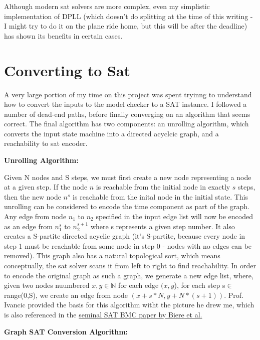 \documentclass[11pt]{article}
\begin{document}
\begin{flushleft}
Although modern sat solvers are more complex, even my simplistic implementation of DPLL (which doesn't do splitting at the time of this writing - I might try to do it on the plane ride home, but this will be after the deadline) has shown its benefits in certain cases.

\section{Converting to Sat} A very large portion of my time on this project was spent tryinng to understand how to convert the inputs to the model checker to a SAT instance. I followed a number of dead-end paths, before finally converging on an algorithm that seems correct. The final algorithm has two components: an unrolling algorithm, which converts the input state machine into a directed acyclcic graph, and a reachability to sat encoder.\bigskip

{\bf{Unrolling Algorithm:}}\medskip

Given N nodes and S steps, we must first create a new node representing a node at a given step. If the node $n$ is reachable from the initial node in exactly $s$ steps, then the new node $n^s$ is reachable from the inital node in the initial state. This unrolling can be considered to encode the time component as part of the graph. Any edge from node $n_1$ to $n_2$ specified in the input edge list will now be encoded as an edge from $n^s_1$ to $n^{s+1}_2$ where s represents a given step number. It also creates a S-partite directed acyclic graph (it's S-partite, because every node in step 1 must be reachable from some node in step 0 - nodes with no edges can be removed). This graph also has a natural topological sort, which means conceptually, the sat solver scans it from left to right to find reachability. In order to encode the original graph as such a graph, we generate a new edge list, where, given two nodes nuumbered $x,y \in \mathbb{N}$ for each edge $(x,y$), for each step s$\in$ range(0,S), we create an edge from node $(x + s*N, y+N*(s+1))$. Prof. Ivancic provided the basis for this algorithm witht the picture he drew me, which is also referenced in the \href{http://www.cs.cmu.edu/~emc/papers/Books%20and%20Edited%20Volumes/Bounded%20Model%20Checking.pdf"}{seminal SAT BMC paper by Biere et al.}\bigskip

{\bf{Graph SAT Conversion Algorithm:}}\medskip


\end{flushleft}
\end{document}
